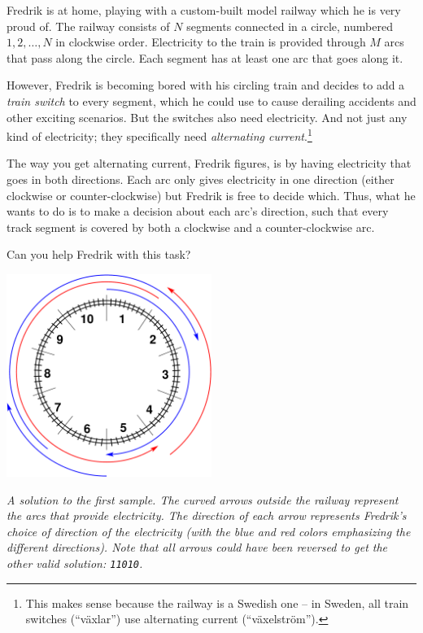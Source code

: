 \ifx\boi\undefined\fi
\def\version{jury-1}
Fredrik is at home, playing with a custom-built model railway which he is very proud of.
The railway consists of $N$ segments connected in a circle, numbered $1, 2, \dots, N$ in clockwise order.
Electricity to the train is provided through $M$ arcs that pass along the
circle. Each segment has at least one arc that goes along it.

However, Fredrik is becoming bored with his circling train and decides to add a \emph{train switch} to every segment, which he could use to cause derailing accidents and other exciting scenarios. But the switches also need electricity.
And not just any kind of electricity; they specifically need \emph{alternating current}.\footnote{This makes sense because the railway is a Swedish one -- in Sweden, all train switches (``växlar'') use alternating current (``växelström'').}

The way you get alternating current, Fredrik figures, is by having electricity
that goes in both directions. Each arc only gives electricity in one direction
(either clockwise or counter-clockwise) but Fredrik is free to decide which.
Thus, what he wants to do is to make a decision about each arc's direction,
such that every track segment is covered by both a clockwise and a
counter-clockwise arc.

Can you help Fredrik with this task?

\vspace{2mm}
\begin{center}
\includegraphics[width=0.5\textwidth]{alternatingfig.pdf}
\end{center}
\vspace{1mm}
{\em A solution to the first sample. The curved arrows outside the railway represent the arcs that provide electricity. The direction of each arrow represents Fredrik's choice of direction of the electricity (with the blue and red colors emphasizing the different directions). Note that all arrows could have been reversed to get the other valid solution: \texttt{11010}.}

